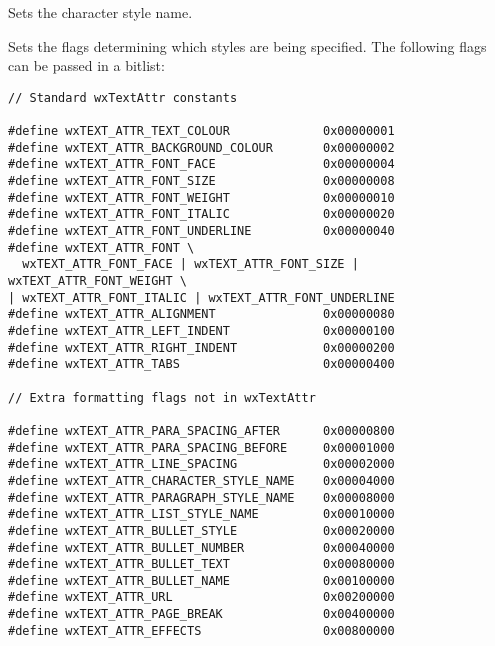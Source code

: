 \label{wxrichtextattrsetcharacterstylename}


Sets the character style name.

\label{wxrichtextattrsetflags}


Sets the flags determining which styles are being specified. The following
flags can be passed in a bitlist:

{\small
\begin{verbatim}
// Standard wxTextAttr constants

#define wxTEXT_ATTR_TEXT_COLOUR             0x00000001
#define wxTEXT_ATTR_BACKGROUND_COLOUR       0x00000002
#define wxTEXT_ATTR_FONT_FACE               0x00000004
#define wxTEXT_ATTR_FONT_SIZE               0x00000008
#define wxTEXT_ATTR_FONT_WEIGHT             0x00000010
#define wxTEXT_ATTR_FONT_ITALIC             0x00000020
#define wxTEXT_ATTR_FONT_UNDERLINE          0x00000040
#define wxTEXT_ATTR_FONT \
  wxTEXT_ATTR_FONT_FACE | wxTEXT_ATTR_FONT_SIZE | wxTEXT_ATTR_FONT_WEIGHT \
| wxTEXT_ATTR_FONT_ITALIC | wxTEXT_ATTR_FONT_UNDERLINE
#define wxTEXT_ATTR_ALIGNMENT               0x00000080
#define wxTEXT_ATTR_LEFT_INDENT             0x00000100
#define wxTEXT_ATTR_RIGHT_INDENT            0x00000200
#define wxTEXT_ATTR_TABS                    0x00000400

// Extra formatting flags not in wxTextAttr

#define wxTEXT_ATTR_PARA_SPACING_AFTER      0x00000800
#define wxTEXT_ATTR_PARA_SPACING_BEFORE     0x00001000
#define wxTEXT_ATTR_LINE_SPACING            0x00002000
#define wxTEXT_ATTR_CHARACTER_STYLE_NAME    0x00004000
#define wxTEXT_ATTR_PARAGRAPH_STYLE_NAME    0x00008000
#define wxTEXT_ATTR_LIST_STYLE_NAME         0x00010000
#define wxTEXT_ATTR_BULLET_STYLE            0x00020000
#define wxTEXT_ATTR_BULLET_NUMBER           0x00040000
#define wxTEXT_ATTR_BULLET_TEXT             0x00080000
#define wxTEXT_ATTR_BULLET_NAME             0x00100000
#define wxTEXT_ATTR_URL                     0x00200000
#define wxTEXT_ATTR_PAGE_BREAK              0x00400000
#define wxTEXT_ATTR_EFFECTS                 0x00800000
\end{verbatim}
}

\label{wxrichtextattrsetfontfacename}

